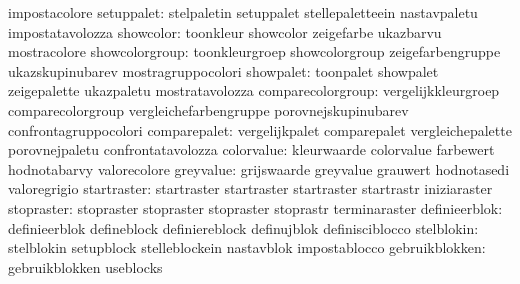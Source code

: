                                   impostacolore
                     setuppalet:  stelpaletin                      setuppalet
                                  stellepaletteein                 nastavpaletu
                                  impostatavolozza
                      showcolor:  toonkleur                        showcolor
                                  zeigefarbe                       ukazbarvu
                                  mostracolore
                 showcolorgroup:  toonkleurgroep                   showcolorgroup
                                  zeigefarbengruppe                ukazskupinubarev
                                  mostragruppocolori
                      showpalet:  toonpalet                        showpalet
                                  zeigepalette                     ukazpaletu
                                  mostratavolozza
              comparecolorgroup:  vergelijkkleurgroep              comparecolorgroup
                                  vergleichefarbengruppe           porovnejskupinubarev
                                  confrontagruppocolori
                   comparepalet:  vergelijkpalet                   comparepalet
                                  vergleichepalette                porovnejpaletu
                                  confrontatavolozza
                     colorvalue:  kleurwaarde                      colorvalue
                                  farbewert                        hodnotabarvy
                                  valorecolore
                      greyvalue:  grijswaarde                      greyvalue
                                  grauwert                         hodnotasedi
                                  valoregrigio
                    startraster:  startraster                      startraster
                                  startraster                      startrastr
                                  iniziaraster                     %
                     stopraster:  stopraster                       stopraster
                                  stopraster                       stoprastr
                                  terminaraster
                  definieerblok:  definieerblok                    defineblock
                                  definiereblock                   definujblok
                                  definisciblocco
                     stelblokin:  stelblokin                       setupblock
                                  stelleblockein                   nastavblok
                                  impostablocco
                 gebruikblokken:  gebruikblokken                   useblocks
